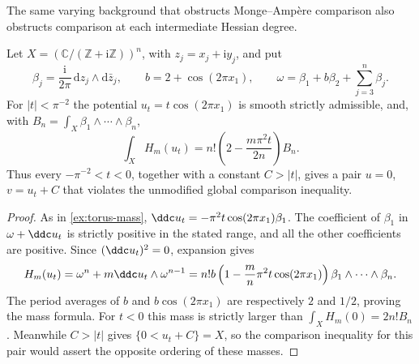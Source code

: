 The same varying background that obstructs Monge--Amp\`ere comparison
also obstructs comparison at each intermediate Hessian degree.

\begin{example}\label{draft627:torus-comparison-obstruction}
Let $X=(\mathbb C/(\mathbb Z+\mathrm i\mathbb Z))^n$, with
$z_j=x_j+\mathrm i y_j$, and put
\[
 \beta_j=\frac{\mathrm i}{2\pi}\,\mathrm dz_j\wedge\mathrm d\bar z_j,
 \qquad b=2+\cos(2\pi x_1),
 \qquad\omega=\beta_1+b\beta_2+\sum_{j=3}^n\beta_j.
\]
For $|t|<\pi^{-2}$ the potential $u_t=t\cos(2\pi x_1)$ is smooth
strictly admissible, and, with $B_n=\int_X\beta_1\wedge\cdots\wedge\beta_n$,
\[
 \int_X H_m(u_t)=n!\left(2-\frac{m\pi^2t}{2n}\right)B_n.
\]
Thus every $-\pi^{-2}<t<0$, together with a constant $C>|t|$,
gives a pair $u=0$, $v=u_t+C$ that violates the unmodified global
comparison inequality.
\end{example}
\begin{proof}
As in \cref{ex:torus-mass},
$\ddc u_t=-\pi^2t\cos(2\pi x_1)\beta_1$.
The coefficient of $\beta_1$ in $\omega+\ddc u_t$ is strictly
positive in the stated range, and all the other coefficients are
positive. Since $(\ddc u_t)^2=0$, expansion gives
\[
 H_m(u_t)=\omega^n+m\ddc u_t\wedge\omega^{n-1}
 =n!b\left(1-\frac mn\pi^2t\cos(2\pi x_1)\right)
                         \beta_1\wedge\cdots\wedge\beta_n.
\]
The period averages of $b$ and $b\cos(2\pi x_1)$ are respectively
$2$ and $1/2$, proving the mass formula. For $t<0$ this mass is
strictly larger than $\int_XH_m(0)=2n!B_n$. Meanwhile $C>|t|$
gives $\{0<u_t+C\}=X$, so the comparison inequality for this pair
would assert the opposite ordering of these masses.
\end{proof}

